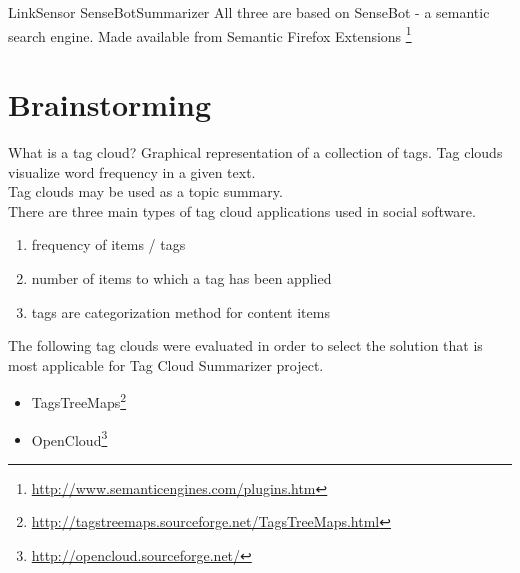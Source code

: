 LinkSensor
SenseBotSummarizer
All three are based on SenseBot - a semantic search engine.
Made available from Semantic Firefox Extensions \footnote{\url{http://www.semanticengines.com/plugins.htm}}\\

\section{Brainstorming}
What is a tag cloud? Graphical representation of a collection of tags. Tag clouds visualize word frequency in a given text.\\

Tag clouds may be used as a topic summary.\\

There are three main types of tag cloud applications used in social software.\\
\begin{enumerate}
\item frequency of items / tags
\item number of items to which a tag has been applied
\item tags are categorization method for content items 
\end{enumerate}
The following tag clouds were evaluated in order to select the solution that is most applicable for Tag Cloud Summarizer project.\\
\begin{itemize}
\item TagsTreeMaps\footnote{\url{http://tagstreemaps.sourceforge.net/TagsTreeMaps.html}}
\item OpenCloud\footnote{\url{http://opencloud.sourceforge.net/}}
\end{itemize}
